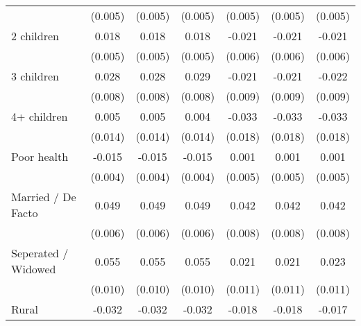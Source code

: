 {\begin{tabular}{l*{6}{c}}
                    &     (0.005)         &     (0.005)         &     (0.005)         &     (0.005)         &     (0.005)         &     (0.005)         \\
2 children          &       0.018\sym{***}&       0.018\sym{***}&       0.018\sym{***}&      -0.021\sym{***}&      -0.021\sym{***}&      -0.021\sym{***}\\
                    &     (0.005)         &     (0.005)         &     (0.005)         &     (0.006)         &     (0.006)         &     (0.006)         \\
3 children          &       0.028\sym{***}&       0.028\sym{***}&       0.029\sym{***}&      -0.021\sym{**} &      -0.021\sym{**} &      -0.022\sym{**} \\
                    &     (0.008)         &     (0.008)         &     (0.008)         &     (0.009)         &     (0.009)         &     (0.009)         \\
4+ children         &       0.005         &       0.005         &       0.004         &      -0.033\sym{*}  &      -0.033\sym{*}  &      -0.033\sym{*}  \\
                    &     (0.014)         &     (0.014)         &     (0.014)         &     (0.018)         &     (0.018)         &     (0.018)         \\
Poor health         &      -0.015\sym{***}&      -0.015\sym{***}&      -0.015\sym{***}&       0.001         &       0.001         &       0.001         \\
                    &     (0.004)         &     (0.004)         &     (0.004)         &     (0.005)         &     (0.005)         &     (0.005)         \\
Married / De Facto  &       0.049\sym{***}&       0.049\sym{***}&       0.049\sym{***}&       0.042\sym{***}&       0.042\sym{***}&       0.042\sym{***}\\
                    &     (0.006)         &     (0.006)         &     (0.006)         &     (0.008)         &     (0.008)         &     (0.008)         \\
Seperated / Widowed &       0.055\sym{***}&       0.055\sym{***}&       0.055\sym{***}&       0.021\sym{**} &       0.021\sym{**} &       0.023\sym{**} \\
                    &     (0.010)         &     (0.010)         &     (0.010)         &     (0.011)         &     (0.011)         &     (0.011)         \\
Rural               &      -0.032\sym{***}&      -0.032\sym{***}&      -0.032\sym{***}&      -0.018\sym{**} &      -0.018\sym{**} &      -0.017\sym{**} \\

\end{tabular}}
